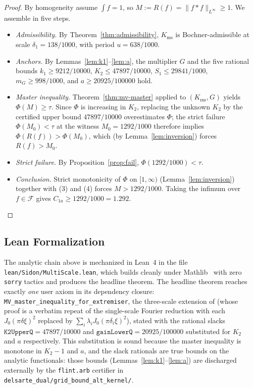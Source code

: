 \documentclass[11pt, letterpaper]{article}
\theoremstyle{plain}
\theoremstyle{definition}
\newcommand{\Linf}{L^\infty}
\newcommand{\Kms}{K_{\mathrm{ms}}}
\begin{document}
\begin{proof}
By homogeneity assume $\int f=1$, so $M:=R(f)=\|f*f\|_{\Linf}\ge 1$.
We assemble in five steps.
\begin{itemize}[leftmargin=2em]
\item[(1)] \emph{Admissibility.}  By Theorem~\ref{thm:admissibility},
$\Kms$ is Bochner-admissible at scale $\delta_1=138/1000$, with
period $u=638/1000$.
\item[(2)] \emph{Anchors.}  By Lemmas~\ref{lem:k1}--\ref{lem:a}, the
multiplier $G$ and the five rational bounds
$k_1\ge 9212/10000$, $K_2\le 47897/10000$, $S_1\le 29841/1000$,
$m_G\ge 998/1000$, and $a\ge 20925/100000$ hold.
\item[(3)] \emph{Master inequality.}  Theorem~\ref{thm:mv-master}
applied to $(\Kms,G)$ yields $\Phi(M)\ge \tau$.  Since $\Phi$ is
increasing in $K_2$, replacing the unknown $K_2$ by the certified
upper bound $47897/10000$ overestimates $\Phi$; the strict failure
$\Phi(M_0)<\tau$ at the witness $M_0=1292/1000$ therefore implies
$\Phi(R(f))>\Phi(M_0)$, which (by Lemma~\ref{lem:inversion}) forces
$R(f)>M_0$.
\item[(4)] \emph{Strict failure.}  By Proposition~\ref{prop:fail},
$\Phi(1292/1000)<\tau$.
\item[(5)] \emph{Conclusion.}  Strict monotonicity of $\Phi$ on
$[1,\infty)$ (Lemma~\ref{lem:inversion}) together with (3) and (4)
forces $M>1292/1000$.  Taking the infimum over $f\in\mathcal{F}$
gives $C_{1a}\ge 1292/1000=1.292$.\qedhere
\end{itemize}
\end{proof}

\subsection{Lean Formalization}\label{subsec:proof-lean}

The analytic chain above is mechanized in Lean~4 in the file
\texttt{lean/Sidon/MultiScale.lean}, which builds cleanly under
Mathlib~\cite{Mathlib,Lean} with zero \texttt{sorry} tactics and
produces the headline theorem.  The headline theorem reaches exactly
\emph{one} user axiom in its dependency closure:
\texttt{MV\_master\_inequality\_for\_extremiser}, the three-scale
extension of \cite[Lemma~3.1]{MV10} (whose proof is a verbatim repeat of
the single-scale Fourier reduction with each $J_0(\pi\delta\xi)^2$
replaced by $\sum_i\lambda_i J_0(\pi\delta_i\xi)^2$), stated with the
rational slacks $\texttt{K2UpperQ}=47897/10000$ and
$\texttt{gainLowerQ}=20925/100000$ substituted for $K_2$ and $a$
respectively.  This substitution is sound because the master inequality
is monotone in $K_2-1$ and $a$, and the slack rationals are true bounds
on the analytic functionals: those bounds (Lemmas~\ref{lem:k1}--\ref{lem:a})
are discharged externally by the \texttt{flint.arb} certifier in
\texttt{delsarte\_dual/grid\_bound\_alt\_kernel/}.
\end{document}
